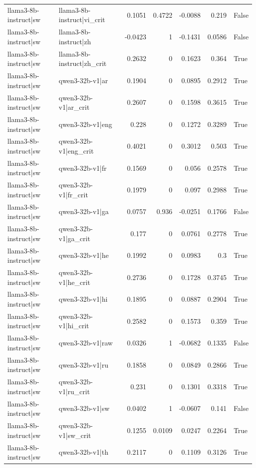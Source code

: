 \begin{table}
\begin{tabular}{l l r r r r l}
llama3-8b-instruct|sw & llama3-8b-instruct|vi_crit & 0.1051 & 0.4722 & -0.0088 & 0.219 & False \\
llama3-8b-instruct|sw & llama3-8b-instruct|zh & -0.0423 & 1 & -0.1431 & 0.0586 & False \\
llama3-8b-instruct|sw & llama3-8b-instruct|zh_crit & 0.2632 & 0 & 0.1623 & 0.364 & True \\
llama3-8b-instruct|sw & qwen3-32b-v1|ar & 0.1904 & 0 & 0.0895 & 0.2912 & True \\
llama3-8b-instruct|sw & qwen3-32b-v1|ar_crit & 0.2607 & 0 & 0.1598 & 0.3615 & True \\
llama3-8b-instruct|sw & qwen3-32b-v1|eng & 0.228 & 0 & 0.1272 & 0.3289 & True \\
llama3-8b-instruct|sw & qwen3-32b-v1|eng_crit & 0.4021 & 0 & 0.3012 & 0.503 & True \\
llama3-8b-instruct|sw & qwen3-32b-v1|fr & 0.1569 & 0 & 0.056 & 0.2578 & True \\
llama3-8b-instruct|sw & qwen3-32b-v1|fr_crit & 0.1979 & 0 & 0.097 & 0.2988 & True \\
llama3-8b-instruct|sw & qwen3-32b-v1|ga & 0.0757 & 0.936 & -0.0251 & 0.1766 & False \\
llama3-8b-instruct|sw & qwen3-32b-v1|ga_crit & 0.177 & 0 & 0.0761 & 0.2778 & True \\
llama3-8b-instruct|sw & qwen3-32b-v1|he & 0.1992 & 0 & 0.0983 & 0.3 & True \\
llama3-8b-instruct|sw & qwen3-32b-v1|he_crit & 0.2736 & 0 & 0.1728 & 0.3745 & True \\
llama3-8b-instruct|sw & qwen3-32b-v1|hi & 0.1895 & 0 & 0.0887 & 0.2904 & True \\
llama3-8b-instruct|sw & qwen3-32b-v1|hi_crit & 0.2582 & 0 & 0.1573 & 0.359 & True \\
llama3-8b-instruct|sw & qwen3-32b-v1|raw & 0.0326 & 1 & -0.0682 & 0.1335 & False \\
llama3-8b-instruct|sw & qwen3-32b-v1|ru & 0.1858 & 0 & 0.0849 & 0.2866 & True \\
llama3-8b-instruct|sw & qwen3-32b-v1|ru_crit & 0.231 & 0 & 0.1301 & 0.3318 & True \\
llama3-8b-instruct|sw & qwen3-32b-v1|sw & 0.0402 & 1 & -0.0607 & 0.141 & False \\
llama3-8b-instruct|sw & qwen3-32b-v1|sw_crit & 0.1255 & 0.0109 & 0.0247 & 0.2264 & True \\
llama3-8b-instruct|sw & qwen3-32b-v1|th & 0.2117 & 0 & 0.1109 & 0.3126 & True \\

\end{tabular}
\end{table}

